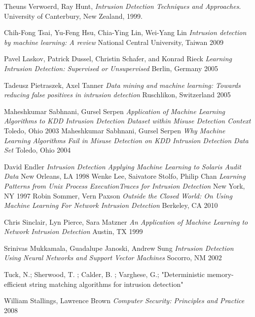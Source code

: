 \documentclass[12pt]{article} %
\begin{document}
\begin{thebibliography}{1}

  Theuns Verwoerd, Ray Hunt,
  \emph{Intrusion Detection Techniques and Approaches}.
  University of Canterbury, New Zealand,
  1999.

  Chih-Fong Tsai, Yu-Feng Hsu, Chia-Ying Lin, Wei-Yang Lin
  \emph{Intrusion detection by machine learning: A review}
  National Central University, Taiwan
  2009
  
  Pavel Laskov, Patrick Dussel, Christin Schafer, and Konrad Rieck
  \emph{Learning Intrusion Detection: Supervised or Unsupervised}
  Berlin, Germany
  2005
  
  Tadeusz Pietraszek, Axel Tanner
  \emph{Data mining and machine learning: Towards reducing false positives in intrusion detection}
  Ruschlikon, Switzerland
  2005
  
    Maheshkumar Sabhnani, Gursel Serpen
    \emph{Application of Machine Learning Algorithms to
KDD Intrusion Detection Dataset within Misuse Detection Context}
    Toledo, Ohio
    2003
  Maheshkumar Sabhnani, Gursel Serpen
  \emph{Why Machine Learning Algorithms Fail in Misuse Detection
on KDD Intrusion Detection Data Set}
  Toledo, Ohio
   2004
   
  David Endler
  \emph{Intrusion Detection
Applying Machine Learning to Solaris Audit Data}
  New Orleans, LA
  1998
  Wenke Lee, Saivatore Stolfo, Philip Chan
  \emph{Learning Patterns from Unix Process ExecutionTraces for Intrusion Detection}
  New York, NY
  1997
  Robin Sommer, Vern Paxson
  \emph{Outside the Closed World:
On Using Machine Learning For Network Intrusion Detection}
  Berkeley, CA
  2010
  
  Chris Sinclair, Lyn Pierce, Sara Matzner
  \emph{An Application of Machine Learning to Network Intrusion Detection}
  Austin, TX
  1999
  
  Srinivas Mukkamala, Guadalupe Janoski, Andrew Sung
  \emph{Intrusion Detection Using Neural Networks and Support Vector Machines}
  Socorro, NM
  2002
  
 Tuck, N.; Sherwood, T. ; Calder, B. ; Varghese, G.;
"Deterministic memory-efficient string matching algorithms for intrusion detection"

  William Stallings, Lawrence Brown
  \emph{Computer Security: Principles and Practice}
  2008

\end{thebibliography}
\end{document}

